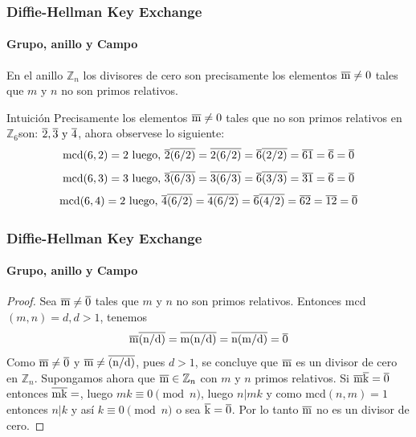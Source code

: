 \documentclass[spanish, mexico]{beamer}
\begin{document}
	\begin{frame}
	    \frametitle{Diffie-Hellman Key Exchange}
		\framesubtitle{Grupo, anillo y Campo}
	    \begin{theorem}[B]
	        En el anillo $\mathbb{Z}_n$ los divisores de cero son precisamente los elementos $\overline{\rm m} \neq 0$ tales que $m$ y $n$ no son primos relativos.
	    \end{theorem}
	    Intuición
	    Precisamente los elementos $\overline{\rm m} \neq 0$ tales que no son primos relativos en $\mathbb{Z}_6$son: $\overline{\rm 2}, \overline{\rm 3} \text{ y } \overline{\rm 4}$, ahora observese lo siguiente:
	    $$
	        \text{mcd}(6, 2) = 2 \text{ luego, } \overline{\rm 2} \overline{\rm (6/2)} = \overline{\rm 2(6/2)} = \overline{\rm 6}\overline{\rm (2/2)} = \overline{\rm 6} \overline{\rm 1} = \overline{\rm 6} = \overline{\rm 0}
	    $$
	    $$
	        \text{mcd}(6, 3) = 3 \text{ luego, } \overline{\rm 3} \overline{\rm (6/3)} = \overline{\rm 3(6/3)} = \overline{\rm 6}\overline{\rm (3/3)} = \overline{\rm 3} \overline{\rm 1} = \overline{\rm 6} = \overline{\rm 0}
	    $$
	    $$
	        \text{mcd}(6, 4) = 2 \text{ luego, } \overline{\rm 4} \overline{\rm (6/2)} = \overline{\rm 4(6/2)} = \overline{\rm 6}\overline{\rm (4/2)} = \overline{\rm 6} \overline{\rm 2} = \overline{\rm 12} = \overline{\rm 0}
	    $$
	\end{frame}
	
	\begin{frame}
	    \frametitle{Diffie-Hellman Key Exchange}
		\framesubtitle{Grupo, anillo y Campo}
	    \begin{proof}
	        Sea $\overline{\rm m} \neq \overline{\rm 0}$ tales que $m$ y $n$ no son primos relativos. Entonces mcd$(m, n) = d, d > 1$, tenemos
	        $$\overline{\rm m} \overline{\rm (n/d)} = \overline{\rm m(n/d)} = \overline{\rm n(m/d)} = \overline{\rm 0}$$
	        Como $\overline{\rm m} \neq \overline{\rm 0}$ y $\overline{\rm m} \neq \overline{\rm (n/d)}$, pues $d > 1$, se concluye que $\overline{\rm m}$ es un divisor de cero en $\mathbb{Z}_n$. Supongamos ahora que $\overline{\rm m} \in \mathbb{Z}_n$ con $m$ y $n$ primos relativos. Si $\overline{\rm m} \overline{\rm k} = \overline{\rm 0}$ entonces $\overline{\rm mk} =$, luego $mk \equiv 0 \pmod{n}$, luego $n|mk$ y como mcd$(n,m) = 1$ entonces $n|k$ y así $k \equiv 0 \pmod{n}$ o sea $\overline{\rm k} = \overline{\rm 0}$. Por lo tanto $\overline{\rm m}$ no es un divisor de cero. 
	    \end{proof}
	\end{frame}
	
\end{document}

